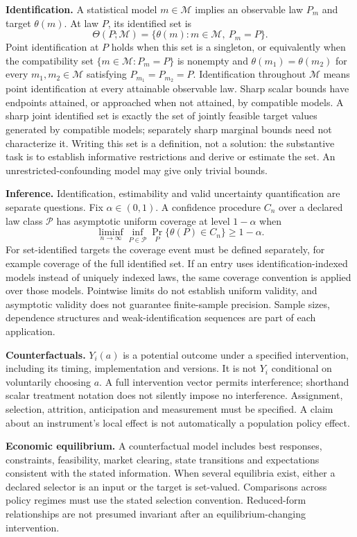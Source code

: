 \documentclass[11pt,a4paper]{article}
\begin{document}
\textbf{Identification.} A statistical model $m\in\mathcal M$ implies an observable law $P_m$ and target $\theta(m)$. At law $P$, its identified set is
\[
\Theta(P;\mathcal M)=\{\theta(m):m\in\mathcal M,\ P_m=P\}.
\]
Point identification at $P$ holds when this set is a singleton, or equivalently when the compatibility set $\{m\in\mathcal M:P_m=P\}$ is nonempty and $\theta(m_1)=\theta(m_2)$ for every $m_1,m_2\in\mathcal M$ satisfying $P_{m_1}=P_{m_2}=P$. Identification throughout $\mathcal M$ means point identification at every attainable observable law. Sharp scalar bounds have endpoints attained, or approached when not attained, by compatible models. A sharp joint identified set is exactly the set of jointly feasible target values generated by compatible models; separately sharp marginal bounds need not characterize it. Writing this set is a definition, not a solution: the substantive task is to establish informative restrictions and derive or estimate the set. An unrestricted-confounding model may give only trivial bounds.

\textbf{Inference.} Identification, estimability and valid uncertainty quantification are separate questions. Fix $\alpha\in(0,1)$. A confidence procedure $C_n$ over a declared law class $\mathcal P$ has asymptotic uniform coverage at level $1-\alpha$ when
\[
\liminf_{n\to\infty}\inf_{P\in\mathcal P}\Pr_P\{\theta(P)\in C_n\}\geq1-\alpha.
\]
For set-identified targets the coverage event must be defined separately, for example coverage of the full identified set. If an entry uses identification-indexed models instead of uniquely indexed laws, the same coverage convention is applied over those models. Pointwise limits do not establish uniform validity, and asymptotic validity does not guarantee finite-sample precision. Sample sizes, dependence structures and weak-identification sequences are part of each application.

\textbf{Counterfactuals.} $Y_i(a)$ is a potential outcome under a specified intervention, including its timing, implementation and versions. It is not $Y_i$ conditional on voluntarily choosing $a$. A full intervention vector permits interference; shorthand scalar treatment notation does not silently impose no interference. Assignment, selection, attrition, anticipation and measurement must be specified. A claim about an instrument's local effect is not automatically a population policy effect.

\textbf{Economic equilibrium.} A counterfactual model includes best responses, constraints, feasibility, market clearing, state transitions and expectations consistent with the stated information. When several equilibria exist, either a declared selector is an input or the target is set-valued. Comparisons across policy regimes must use the stated selection convention. Reduced-form relationships are not presumed invariant after an equilibrium-changing intervention.
\end{document}
